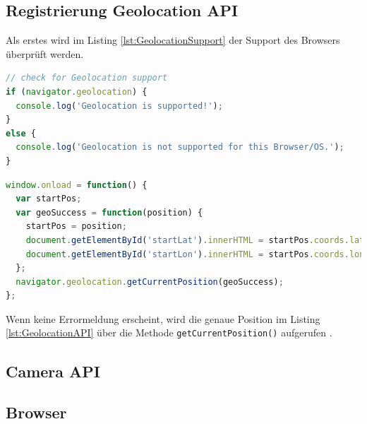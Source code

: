 \subsection{Registrierung Geolocation API}
Als erstes wird im Listing \ref{lst:GeolocationSupport}  der Support des Browsers überprüft werden.


\begin{lstlisting}[language=JavaScript, caption={Geolocation Support},label=lst:GeolocationSupport, xleftmargin=50pt]
// check for Geolocation support
if (navigator.geolocation) {
  console.log('Geolocation is supported!');
}
else {
  console.log('Geolocation is not supported for this Browser/OS.');
}
\end{lstlisting}

\begin{lstlisting}[language=JavaScript, caption={Geolocation API},label=lst:GeolocationAPI, xleftmargin=50pt]
window.onload = function() {
  var startPos;
  var geoSuccess = function(position) {
    startPos = position;
    document.getElementById('startLat').innerHTML = startPos.coords.latitude;
    document.getElementById('startLon').innerHTML = startPos.coords.longitude;
  };
  navigator.geolocation.getCurrentPosition(geoSuccess);
};
\end{lstlisting}

Wenn keine Errormeldung erscheint, wird die genaue Position im Listing \ref{lst:GeolocationAPI} über die Methode \texttt{getCurrentPosition()}  aufgerufen \cite{UserLocation}.  


\subsection{Camera API}


\subsection{Browser} 






